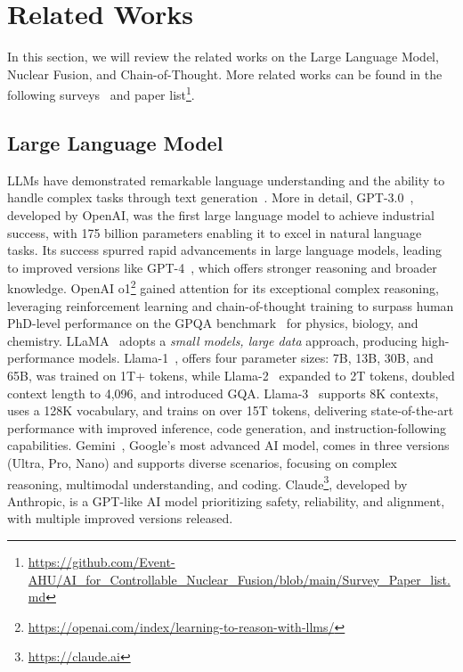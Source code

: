 \section{Related Works}
\label{relatedWorks}

In this section, we will review the related works on the Large Language Model, Nuclear Fusion, and Chain-of-Thought. More related works can be found in the following surveys~\cite{wang2023MMPTMs} and paper list\footnote{\url{https://github.com/Event-AHU/AI_for_Controllable_Nuclear_Fusion/blob/main/Survey_Paper_list.md}}.  



\subsection{Large Language Model}  
LLMs have demonstrated remarkable language understanding and the ability to handle complex tasks through text generation~\cite{jin2024MSP60K, wang2024r2gencsr, wang2025AMMRG}. 
More in detail, GPT-3.0~\cite{kojima2022letsthinkstepbystep}, developed by OpenAI, was the first large language model to achieve industrial success, with 175 billion parameters enabling it to excel in natural language tasks. Its success spurred rapid advancements in large language models, leading to improved versions like GPT-4~\cite{achiam2023gpt4}, which offers stronger reasoning and broader knowledge. OpenAI o1\footnote{\url{https://openai.com/index/learning-to-reason-with-llms/}} gained attention for its exceptional complex reasoning, leveraging reinforcement learning and chain-of-thought training to surpass human PhD-level performance on the GPQA benchmark~\cite{rein2023gpqa} for physics, biology, and chemistry. LLaMA~\cite{touvron2023llama1} adopts a \textit{small models, large data} approach, producing high-performance models. Llama-1~\cite{touvron2023llama1}, offers four parameter sizes: 7B, 13B, 30B, and 65B, was trained on 1T+ tokens, while Llama-2~\cite{touvron2023llama2} expanded to 2T tokens, doubled context length to 4,096, and introduced GQA. Llama-3~\cite{grattafiori2024llama3} supports 8K contexts, uses a 128K vocabulary, and trains on over 15T tokens, delivering state-of-the-art performance with improved inference, code generation, and instruction-following capabilities. Gemini~\cite{team2023gemini}, Google's most advanced AI model, comes in three versions (Ultra, Pro, Nano) and supports diverse scenarios, focusing on complex reasoning, multimodal understanding, and coding. Claude\footnote{\url{https://claude.ai}}, developed by Anthropic, is a GPT-like AI model prioritizing safety, reliability, and alignment, with multiple improved versions released. 


